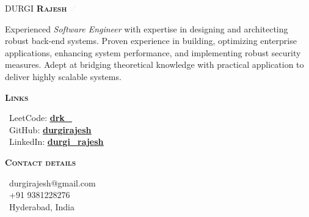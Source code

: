 \documentclass[11pt, a4paper]{article}
\newcommand{\headleft}[1]{\vspace*{0.8ex}\textsc{\textbf{#1}}\par%
    \vspace*{-1.5ex}\hrulefill\par\vspace*{0.1ex}}
\begin{document}
\setlength{\topskip}{0pt}
\setlength{\parindent}{0pt}
\setlength{\parskip}{0pt}
\setlength{\fboxsep}{0pt}
\pagestyle{empty}
\raggedbottom

\color{text}

\begin{minipage}[t][\textheight][t]{0.305\textwidth} %
\colorbox{heading}{\begin{minipage}[t][5mm][t]{\textwidth}\null\hfill\null\end{minipage}}

\vspace{-.2ex} %
\colorbox{heading!90}{\color{white}  %
\textwidth\relax%
\begin{minipage}[t][\textheight][t]{0.82\textwidth}
\raggedright
\vspace*{1.5ex}


\huge DURGI \textbf{\textsc{Rajesh}} \href{https://www.durgirajesh.in/}{\textcolor{white}{\includegraphics[height=0.8em]{arrow-up-right-from-square-sharp-solid-full.png}}} \normalsize

\vspace{0.7em}
Experienced \textit{Software Engineer} with expertise in designing and architecting robust back-end systems. Proven experience in building, optimizing enterprise applications, enhancing system performance, and implementing robust security measures. Adept at bridging theoretical knowledge with practical application to deliver highly scalable systems.


\headleft{Links}
\faCode\ LeetCode: \href{https://leetcode.com/u/drk_/}{{\color{white}\underline{\textbf{drk\_}}}} \\
\faGithub\ GitHub:  \href{https://github.com/durgirajesh}{{\color{white}\underline{\bf durgirajesh}}} \\
\faLinkedin\ LinkedIn: \href{https://www.linkedin.com/in/durgi-rajesh/}{{\color{white}\underline{\textbf{durgi\_rajesh}}}}

\headleft{Contact details}
\small %
\faPaperPlane\ {\small durgirajesh@gmail.com} \\[0.4ex]
\faPhone\ +91 9381228276 \\[0.5ex]
\faHome\ Hyderabad, India
\normalsize


\end{minipage}}
\end{minipage}
\end{document}
